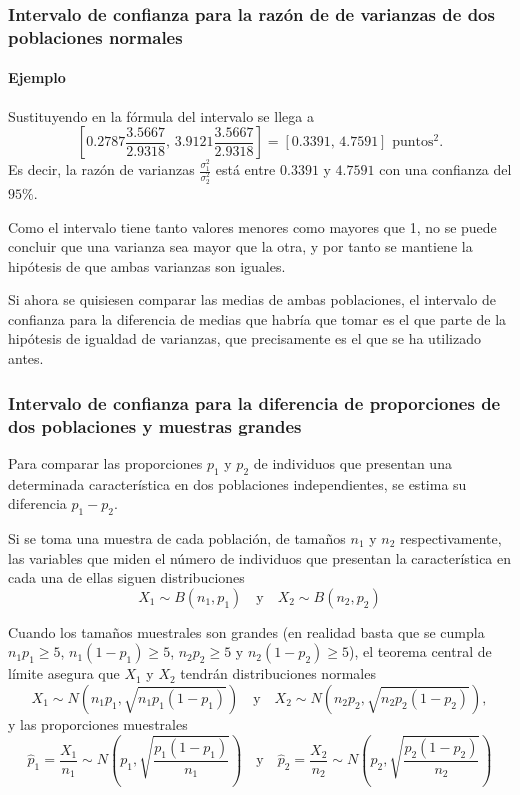 \begin{frame}
\frametitle{Intervalo de confianza para la razón de de varianzas de dos poblaciones normales}
\framesubtitle{Ejemplo}
Sustituyendo en la fórmula del intervalo se llega a
\[
\left[0.2787\frac{3.5667}{2.9318},\, 3.9121\frac{3.5667}{2.9318}\right] = [0.3391,\, 4.7591] \text{ puntos}^2.
\]
Es decir, la razón de varianzas $\frac{\sigma_1^2}{\sigma_2^2}$ está entre $0.3391$ y $4.7591$ con una confianza del
$95\%$.

Como el intervalo tiene tanto valores menores como mayores que 1, no se puede concluir que una varianza sea mayor que la otra, y por tanto se mantiene la hipótesis de que ambas varianzas son iguales.

Si ahora se quisiesen comparar las medias de ambas poblaciones, el intervalo de confianza para la diferencia de medias que habría que tomar es el que parte de la hipótesis de igualdad de varianzas, que precisamente es el que se ha utilizado antes.
\end{frame}


\begin{frame}
\frametitle{Intervalo de confianza para la diferencia de proporciones de dos poblaciones y muestras grandes}
Para comparar las proporciones $p_1$ y $p_2$ de individuos que presentan una determinada característica en dos poblaciones independientes, se estima su diferencia $p_1-p_2$.

Si se toma una muestra de cada población, de tamaños $n_1$ y $n_2$ respectivamente, las variables que miden el número de individuos que presentan la característica en cada una de ellas siguen distribuciones
\[
X_1\sim B(n_1,p_1)\quad \mbox{y}\quad X_2\sim B(n_2,p_2)
\]

Cuando los tamaños muestrales son grandes (en realidad basta que se cumpla $n_1p_1\geq 5$, $n_1(1-p_1)\geq 5$, $n_2p_2\geq 5$ y $n_2(1-p_2)\geq 5$), el teorema central de límite asegura que $X_1$ y $X_2$ tendrán distribuciones normales
\[
X_1\sim N(n_1p_1,\sqrt{n_1p_1(1-p_1)}) \quad \mbox{y}\quad X_2\sim N(n_2p_2,\sqrt{n_2p_2(1-p_2)}),
\]
y las proporciones muestrales
\[
\hat{p}_1=\frac{X_1}{n_1} \sim N\left(p_1,\sqrt{\frac{p_1(1-p_1)}{n_1}}\right) \quad \mbox{y}\quad
\hat{p}_2=\frac{X_2}{n_2} \sim N\left(p_2,\sqrt{\frac{p_2(1-p_2)}{n_2}}\right)
\]
\end{frame}


